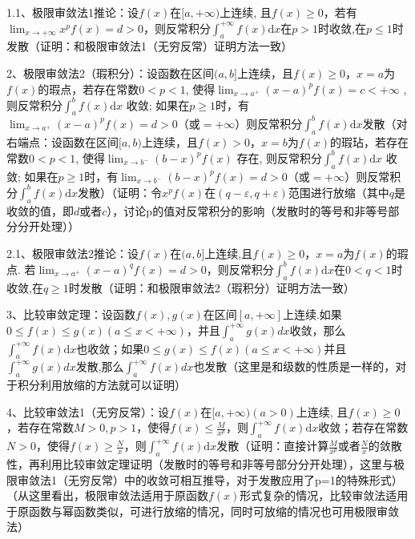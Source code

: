1.1、极限审敛法1推论：设$f(x)$在$[a,+\infty)$上连续, 且$f(x) \geqslant 0$，若有$\lim_{x \rightarrow+\infty} x^{p} f(x)=d>0$，则反常积分$\int_{a}^{+\infty} f(x) \mathrm{d} x$在$p>1$时收敛,在$p \leqslant 1$时发散（证明：和极限审敛法1（无穷反常）证明方法一致）

2、极限审敛法2（瑕积分）：设函数在区间$(a,b]$上连续，且$f(x) \geqslant 0$，$x=a$为$f(x)$的瑕点，若存在常数$0<p<1$, 使得$\lim_{x \rightarrow a^{+}}(x-a)^{p} f(x) =c<+\infty$ , 则反常积分$\int_{a}^{b} f(x) \mathrm{d} x$ 收敛; 如果在$p \geqslant 1$时，有$\lim _{x \rightarrow a^{+}}(x-a)^{p} f(x)=d>0$（或$=+\infty$）则反常积分$\int_{a}^{b} f(x) \mathrm{d} x$发散（对右端点：设函数在区间$[a,b)$上连续，且$f(x) \gt 0$，$x=b$为$f(x)$的瑕玷，若存在常数$0<p<1$, 使得$\lim_{x \rightarrow b^{-}}(b-x)^{p} f(x)$ 存在, 则反常积分$\int_{a}^{b} f(x) \mathrm{d} x$ 收敛; 如果在$p \geqslant 1$时，有$\lim _{x \rightarrow b^{-}}(b-x)^{p} f(x)=d>0$（或$=+\infty$）则反常积分$\int_{a}^{b} f(x) \mathrm{d} x$发散）（证明：令$x^{p} f(x)$在$(q-\varepsilon,q+\varepsilon)$范围进行放缩（其中$q$是收敛的值，即$d$或者$c$），讨论p的值对反常积分的影响（发散时的等号和非等号部分分开处理））

2.1、极限审敛法2推论：设$f(x)$在$(a, b]$上连续,且$f(x) \geqslant 0$，$ x=a$为$f(x)$的瑕点. 若$\lim_{x \rightarrow a^{+}}(x-a)^{q} f(x)=d>0$，则反常积分$\int_{a}^{b} f(x) \mathrm{d} x$在$0<q<1$时收敛,在$q \geqslant 1$时发散（证明：和极限审敛法2（瑕积分）证明方法一致）

3、比较审敛定理：设函数$f(x), g(x)$在区间$[a,+\infty]$上连续.如果$0 \leqslant f(x) \leqslant g(x)(a \leqslant x<+\infty)$，并且$\int_{a}^{+\infty} g(x) d x$收敛，那么$\int_{a}^{+\infty} f(x) \mathrm{d} x$也收敛；如果$0 \leq g(x) \leq f(x)(a \leq x<+\infty)$并且$\int_{a}^{+\infty} g(x) d x$发散,那么$\int_{a}^{+\infty} f(x) d x$也发散（这里是和级数的性质是一样的，对于积分利用放缩的方法就可以证明）

4、比较审敛法1（无穷反常）：设$f(x)$在$[a,+\infty)(a>0)$上连续, 且$f(x) \geqslant 0$，若存在常数$M>0, p>1$，使得$f(x) \leqslant \frac{M}{x^{p}}$，则$\int_{a}^{+\infty} f(x) \mathrm{d} x$收敛；若存在常数$N>0$，使得$f(x) \geqslant \frac{N}{x}$，则$ \int_{a}^{+\infty} f(x) \mathrm{d} x$发散（证明：直接计算$\frac{M}{x^{p}}$或者$\frac{N}{x}$的敛散性，再利用比较审敛定理证明（发散时的等号和非等号部分分开处理），这里与极限审敛法1（无穷反常）中的收敛可相互推导，对于发散应用了p=1的特殊形式）（从这里看出，极限审敛法适用于原函数$f(x)$形式复杂的情况，比较审敛法适用于原函数与幂函数类似，可进行放缩的情况，同时可放缩的情况也可用极限审敛法）


